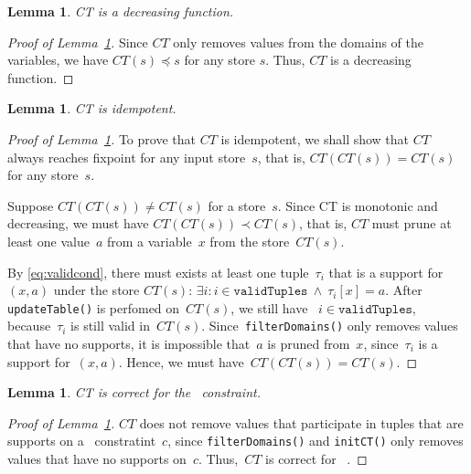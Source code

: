 \documentclass[a4paper,11pt]{article}
\newtheorem{lemma}[theorem]{Lemma}
\newcommand{\T}[1]{\texttt{#1}}
\newcommand{\Table}{\Constraint{Table}~}
\newcommand{\Lemmaref}[1]{Lemma~\ref{#1}}
\newcommand{\Eqref}[1]{\eqref{#1}}
\newcommand{\CurrTable}{\texttt{validTuples}}
\numberwithin{equation}{section}
\begin{document}
\begin{lemma} \label{lemma:decreasing}
  CT is a decreasing function.
\end{lemma}

\begin{proof}[Proof of \Lemmaref{lemma:decreasing}]
  Since $CT$ only removes values from
  the domains of the variables, we have $CT(s) \preceq s$ for any store $s$.
  Thus, $CT$ is a decreasing function.
\end{proof}

\begin{lemma}\label{lemma:idempotent}
  CT is idempotent.
\end{lemma}

\begin{proof}[Proof of \Lemmaref{lemma:idempotent}]
  To prove that $CT$ is idempotent, we shall show that $CT$ always reaches
  fixpoint for any input store~$s$, that is, $CT(CT(s)) = CT(s)$ for any
  store~$s$.

  Suppose $CT(CT(s)) \neq CT(s)$ for a store~$s$. 
  Since CT is monotonic
  and decreasing, we must have $CT(CT(s)) \prec CT(s)$, that is, $CT$
  must prune at least one value~$a$ from a variable~$x$ from the 
  store~$CT(s)$. 

  By \Eqref{eq:validcond}, there must exists at least one 
  tuple~$\tau_i$
  that is a support for~$(x,a)$ under the store $CT(s)$: 
  $\exists i: i \in \CurrTable \ \land \ \tau_i[x] = a$.
  After \T{updateTable()} is perfomed on~$CT(s)$, we still have
  ~$i \in \CurrTable$, because~$\tau_i$ is still valid in~$CT(s)$.
  Since~\T{filterDomains()} only removes values that have no supports,
  it is impossible that~$a$ is pruned from~$x$, since~$\tau_i$ is a
  support for~$(x,a)$. Hence, we must have~$CT(CT(s)) = CT(s)$.
\end{proof}


\begin{lemma}\label{lemma:correct}
  CT is correct for the \Table constraint.
\end{lemma}

\begin{proof}[Proof of \Lemmaref{lemma:correct}]
  $CT$ does not remove values that participate in tuples that are supports
  on a \Table constratint~$c$,
  since \T{filterDomains()} and \T{initCT()} only removes values that 
  have no supports on~$c$. Thus,~$CT$ is correct for \Table.
\end{proof}
\end{document}
